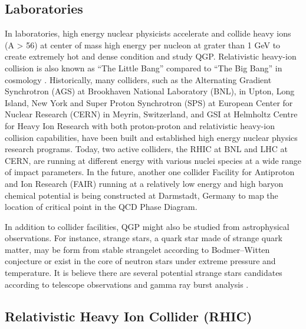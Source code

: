 \subsection{Laboratories}

In laboratories, high energy nuclear physicists accelerate and collide heavy ions (A > 56) at center of mass high energy per nucleon at grater than 1 GeV to create extremely hot and dense condition and study QGP. Relativistic heavy-ion collision is also known as ``The Little Bang'' compared to ``The Big Bang'' in cosmology \cite{}. Historically, many colliders, such as the Alternating Gradient Synchrotron (AGS) at Brookhaven National Laboratory (BNL), in Upton, Long Island, New York and Super Proton Synchrotron (SPS) at European Center for Nuclear Research (CERN) in Meyrin, Switzerland, and GSI at Helmholtz Centre for Heavy Ion Research with both proton-proton and relativistic heavy-ion collision capabilities, have been built and established high energy nuclear physics research programs. Today, two active colliders, the RHIC at BNL and LHC at CERN, are running at different energy with various nuclei species at a wide range of impact parameters. In the future, another one collider Facility for Antiproton and Ion Research (FAIR) running at a relatively low energy and high baryon chemical potential is being constructed at Darmstadt, Germany to map the location of critical point in the QCD Phase Diagram. 

In addition to collider facilities, QGP might also be studied from astrophysical observations. For instance, strange stars, a quark star made of strange quark matter, may be form from stable strangelet according to Bodmer--Witten conjecture \cite{SQMReview} or exist in the core of neutron stars under extreme pressure and temperature. It is believe there are several potential strange stars candidates according to telescope observations and gamma ray burst analysis \cite{SS1,SS2,SS3}.


\subsection{Relativistic Heavy Ion Collider (RHIC)}

